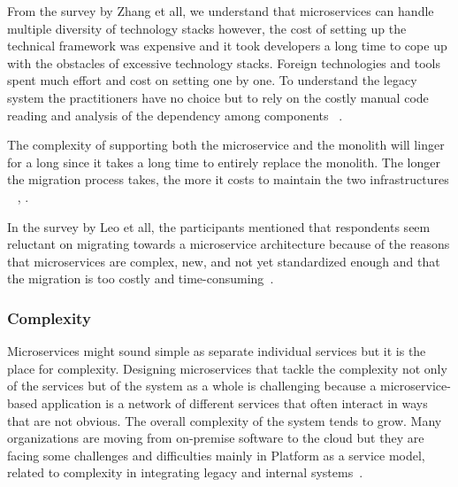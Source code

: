 From the survey by Zhang et all, we understand that microservices can handle multiple diversity of technology stacks however, the cost of setting up the technical framework was expensive and it took developers a long time to cope up with the obstacles of excessive technology stacks. Foreign technologies and tools spent much effort and cost on setting one by one. To understand the legacy system the practitioners have no choice but to rely on the costly manual code reading and analysis of the dependency among components ~\cite{Zhang2019}. 

The complexity of supporting both the microservice and the monolith will linger for a long since it takes a long time to entirely replace the monolith. The longer the migration process takes, the more it costs to maintain the two infrastructures ~\cite{Ndungu2019} \cite{Meshenburg2016}, \cite{Michael2018}.

In the survey by Leo et all, the participants mentioned that respondents seem reluctant on migrating towards a microservice architecture because of the reasons that microservices are complex, new, and not yet standardized enough and that the migration is too costly and time-consuming~\cite{Leo2019}.



\subsubsection{Complexity}%

Microservices might sound simple as separate individual services but it is the place for complexity. Designing microservices that tackle the complexity not only of the services but of the system as a whole is challenging because a microservice-based application is a network of different services that often interact in ways that are not obvious. The overall complexity of the system tends to grow. Many organizations are moving from on-premise software to the cloud but they are facing some challenges and difficulties mainly in Platform as a service model, related to complexity in integrating legacy and internal systems~\cite{rosa2018, Zaytev2018}.


